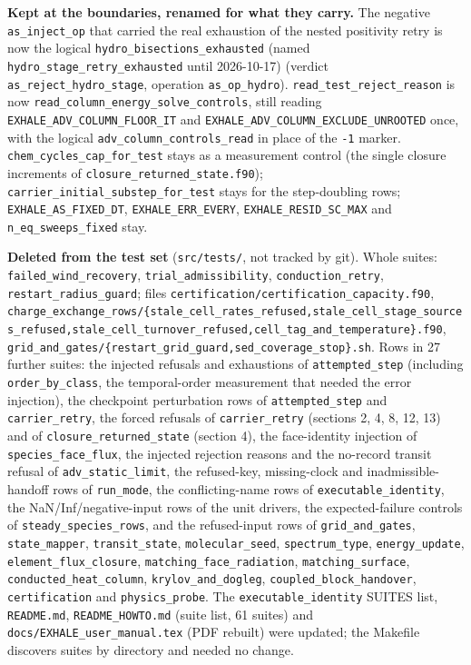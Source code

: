 \documentclass[english,a4paper]{my_memo}
\begin{document}
\textbf{Kept at the boundaries, renamed for what they carry.} The negative \texttt{as\_inject\_op} that carried the real exhaustion of the nested positivity retry is now the logical \texttt{hydro\_bisections\_exhausted} (named \texttt{hydro\_stage\_retry\_exhausted} until 2026-10-17) (verdict \texttt{as\_reject\_hydro\_stage}, operation \texttt{as\_op\_hydro}). \texttt{read\_test\_reject\_reason} is now \texttt{read\_column\_energy\_solve\_controls}, still reading \texttt{EXHALE\_ADV\_COLUMN\_FLOOR\_IT} and \texttt{EXHALE\_ADV\_COLUMN\_EXCLUDE\_UNROOTED} once, with the logical \texttt{adv\_column\_controls\_read} in place of the \texttt{-1} marker. \texttt{chem\_cycles\_cap\_for\_test} stays as a measurement control (the single closure increments of \texttt{closure\_returned\_state.f90}); \texttt{carrier\_initial\_substep\_for\_test} stays for the step-doubling rows; \texttt{EXHALE\_AS\_FIXED\_DT}, \texttt{EXHALE\_ERR\_EVERY}, \texttt{EXHALE\_RESID\_SC\_MAX} and \texttt{n\_eq\_sweeps\_fixed} stay.

\textbf{Deleted from the test set} (\texttt{src/tests/}, not tracked by git). Whole suites: \texttt{failed\_wind\_recovery}, \texttt{trial\_admissibility}, \texttt{conduction\_retry}, \texttt{restart\_radius\_guard}; files \texttt{certification/certification\_capacity.f90}, \texttt{charge\_exchange\_rows/\{stale\_cell\_rates\_refused,stale\_cell\_stage\_sources\_refused,stale\_cell\_turnover\_refused,cell\_tag\_and\_temperature\}.f90}, \texttt{grid\_and\_gates/\{restart\_grid\_guard,sed\_coverage\_stop\}.sh}. Rows in 27 further suites: the injected refusals and exhaustions of \texttt{attempted\_step} (including \texttt{order\_by\_class}, the temporal-order measurement that needed the error injection), the checkpoint perturbation rows of \texttt{attempted\_step} and \texttt{carrier\_retry}, the forced refusals of \texttt{carrier\_retry} (sections 2, 4, 8, 12, 13) and of \texttt{closure\_returned\_state} (section 4), the face-identity injection of \texttt{species\_face\_flux}, the injected rejection reasons and the no-record transit refusal of \texttt{adv\_static\_limit}, the refused-key, missing-clock and inadmissible-handoff rows of \texttt{run\_mode}, the conflicting-name rows of \texttt{executable\_identity}, the NaN/Inf/negative-input rows of the unit drivers, the expected-failure controls of \texttt{steady\_species\_rows}, and the refused-input rows of \texttt{grid\_and\_gates}, \texttt{state\_mapper}, \texttt{transit\_state}, \texttt{molecular\_seed}, \texttt{spectrum\_type}, \texttt{energy\_update}, \texttt{element\_flux\_closure}, \texttt{matching\_face\_radiation}, \texttt{matching\_surface}, \texttt{conducted\_heat\_column}, \texttt{krylov\_and\_dogleg}, \texttt{coupled\_block\_handover}, \texttt{certification} and \texttt{physics\_probe}. The \texttt{executable\_identity} SUITES list, \texttt{README.md}, \texttt{README\_HOWTO.md} (suite list, 61 suites) and \texttt{docs/EXHALE\_user\_manual.tex} (PDF rebuilt) were updated; the Makefile discovers suites by directory and needed no change.
\end{document}
